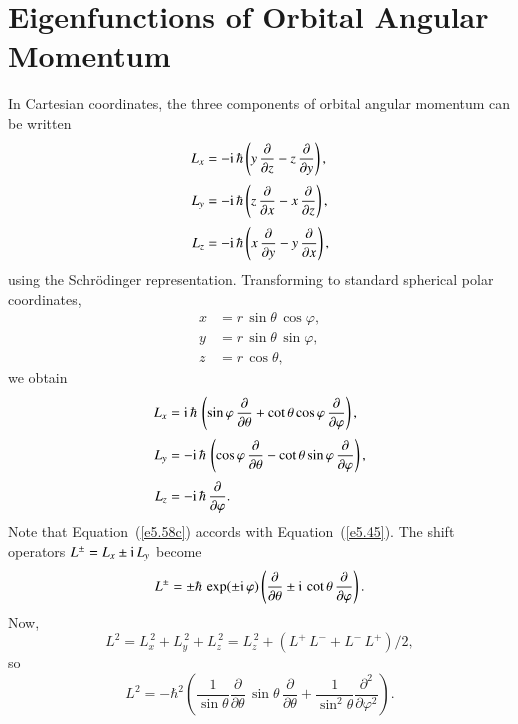 \section{Eigenfunctions of Orbital Angular Momentum}\label{s5.4}
In Cartesian coordinates, the three components of orbital angular
momentum can be written 
\begin{align}\label{e4.74v}
L_x &= -{\rm i}\,\hbar\left(y\,\frac{\partial}{\partial z} - z\,\frac{\partial}
{\partial y}\right),\\[0.5ex]
L_y &= -{\rm i}\,\hbar\left(z\,\frac{\partial}{\partial x} - x\,\frac{\partial}
{\partial z}\right),\\[0.5ex]
L_z &= -{\rm i}\,\hbar\left(x\,\frac{\partial}{\partial y} - y\,\frac{\partial}
{\partial x}\right),\label{e4.76v}
\end{align}
using the Schr\"{o}dinger representation. Transforming to standard
spherical polar coordinates,
\begin{align}
x &= r \,\sin\theta\, \cos\varphi,\\[0.5ex]
y &= r\, \sin\theta\, \sin\varphi,\\[0.5ex]
z &= r\,\cos\theta,\label{e4.79v}
\end{align}
we obtain
\begin{align}\label{e5.58a}
L_x &= {\rm i}\,\hbar\,\left(\sin\varphi\, \frac{\partial}{\partial \theta}
+ \cot\theta \cos\varphi\,\frac{\partial}{\partial \varphi}\right),
\\[0.5ex]
L_y &= -{\rm i} \,\hbar\,\left(\cos\varphi\, \frac{\partial}{\partial\theta}
-\cot\theta \sin\varphi \,\frac{\partial}{\partial \varphi}\right),\\[0.5ex]
L_z&= -{\rm i}\,\hbar\,\frac{\partial}{\partial\varphi}.\label{e5.58c}
\end{align}
Note that Equation~(\ref{e5.58c}) accords with Equation~(\ref{e5.45}). The shift
operators $L^\pm = L_x \pm {\rm i}\,L_y$ become
\begin{equation}\label{e5.59}
L^\pm = \pm \hbar\,\exp(\pm{\rm i}\,\varphi)\left(\frac{\partial}{\partial\theta}
\pm{\rm i} \,\cot\theta\,\frac{\partial}{\partial\varphi}\right).
\end{equation}
Now,
\begin{equation}
L^2 = L_x^{\,2}+L_y^{\,2}+L_z^{\,2} = L_z^{\,2} + (L^+\, L^- + L^- \,L^+) /2,
\end{equation}
so
\begin{equation}\label{e5.61}
L^2 = - \hbar^2\left( \frac{1}{\sin\theta}\frac{\partial}{\partial\theta}\,
\sin\theta\,\frac{\partial}{\partial\theta} + \frac{1}{\sin^2\theta}\frac{\partial^2}
{\partial\varphi^2}\right).
\end{equation}

